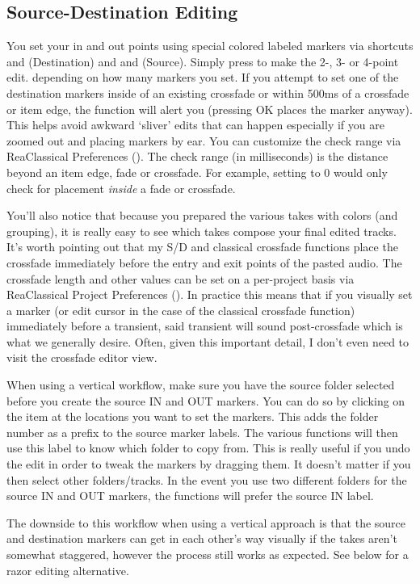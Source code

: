 \documentclass[10pt,american]{article}
\begin{document}
\subsection{Source-Destination Editing}

You set your in and out points using special colored labeled markers via
shortcuts  and  (Destination) and  and 
(Source). Simply press  to make the 2-, 3- or 4-point edit. depending on
how many markers you set. If you attempt to set one of the destination markers
inside of an existing crossfade or within 500ms of a crossfade or item edge, the
function will alert you (pressing OK places the marker anyway). This helps avoid
awkward `sliver' edits that can happen especially if you are zoomed out and
placing markers by ear. You can customize the check range via ReaClassical
Preferences (). The check range (in milliseconds) is the distance
beyond an item edge, fade or crossfade. For example, setting to 0 would only
check for placement \emph{inside }a fade or crossfade.

You'll also notice that because you prepared the various takes with colors (and
grouping), it is really easy to see which takes compose your final edited
tracks. It's worth pointing out that my S/D and classical crossfade functions
place the crossfade immediately before the entry and exit points of the pasted
audio. The crossfade length and other values can be set on a per-project basis
via ReaClassical Project Preferences (). In practice this means that if
you visually set a marker (or edit cursor in the case of the classical crossfade
function) immediately before a transient, said transient will sound
post-crossfade which is what we generally desire. Often, given this important
detail, I don't even need to visit the crossfade editor view.

When using a vertical workflow, make sure you have the source folder selected
before you create the source IN and OUT markers. You can do so by clicking on
the item at the locations you want to set the markers. This adds the folder
number as a prefix to the source marker labels. The various functions will then
use this label to know which folder to copy from. This is really useful if you
undo the edit in order to tweak the markers by dragging them. It doesn't matter
if you then select other folders/tracks. In the event you use two different
folders for the source IN and OUT markers, the functions will prefer the source
IN label.

The downside to this workflow when using a vertical approach is that the source
and destination markers can get in each other's way visually if the takes aren't
somewhat staggered, however the process still works as expected. See below for a
razor editing alternative.
\end{document}
